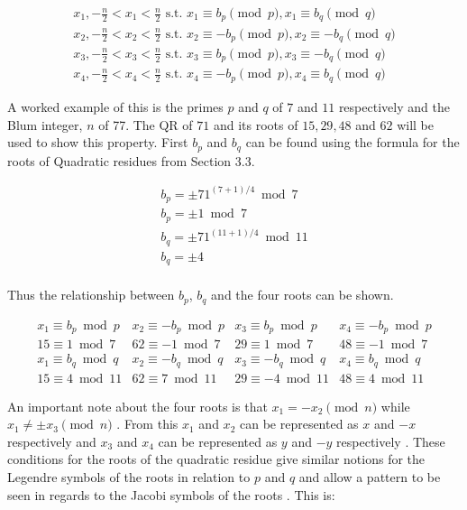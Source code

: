\documentclass{article}
\begin{document}
$$
\begin{array}{l}
x_1, -\frac{n}{2} < x_1 < \frac{n}{2} \mbox{ s.t. } x_1 \equiv b_p \pmod{p}, x_1 \equiv b_q \pmod{q} \\
x_2, -\frac{n}{2} < x_2 < \frac{n}{2} \mbox{ s.t. } x_2 \equiv -b_p \pmod{p}, x_2 \equiv -b_q \pmod{q} \\
x_3, -\frac{n}{2} < x_3 < \frac{n}{2} \mbox{ s.t. } x_3 \equiv b_p \pmod{p}, x_3 \equiv -b_q \pmod{q} \\
x_4, -\frac{n}{2} < x_4 < \frac{n}{2} \mbox{ s.t. } x_4 \equiv -b_p \pmod{p}, x_4 \equiv b_q \pmod{q}
\end{array}
$$

A worked example of this is the primes $p$ and $q$ of $7$ and $11$ respectively and the Blum integer, $n$ of 77. The QR of $71$ and its roots of $15, 29, 48$ and $62$ will be used to show this property. First $b_p$ and $b_q$ can be found using the formula for the roots of Quadratic residues from Section 3.3.

$$
\begin{array}{l}
b_p = \pm 71^{(7+1)/4} \bmod 7 \\
b_p = \pm 1 \bmod 7 \\
b_q = \pm 71^{(11+1)/4} \bmod 11 \\
b_q = \pm 4 \\
\end{array}
$$

Thus the relationship between $b_p$, $b_q$ and the four roots can be shown.

$$
\begin{array}{llll}
x_1 \equiv b_p \bmod p & x_2 \equiv -b_p \bmod p & x_3 \equiv b_p \bmod p & x_4 \equiv -b_p \bmod p \\
15 \equiv 1 \bmod 7 & 62 \equiv -1 \bmod 7 & 29 \equiv 1 \bmod 7 & 48 \equiv -1 \bmod 7 \\
x_1 \equiv b_q \bmod q & x_2 \equiv -b_q \bmod q & x_3 \equiv -b_q \bmod q & x_4 \equiv b_q \bmod q \\
15 \equiv 4 \bmod 11 & 62 \equiv 7 \bmod 11 & 29 \equiv -4 \bmod 11 & 48 \equiv 4 \bmod 11  
\end{array}
$$

An important note about the four roots is that $x_1 = -x_2 \pmod{n}$ while $x_1 \not= \pm x_3 \pmod{n}$ \cite{Mora2013}. From this $x_1$ and $x_2$ can be represented as $x$ and $-x$ respectively and $x_3$ and $x_4$ can be represented as $y$ and $-y$ respectively \cite{Mora2013}. These conditions for the roots of the quadratic residue give similar notions for the Legendre symbols of the roots in relation to $p$ and $q$ and allow a pattern to be seen in regards to the Jacobi symbols of the roots \cite{Mora2013}. This is:
\end{document}
